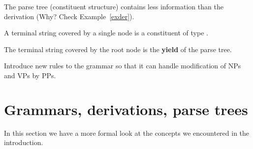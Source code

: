 \documentclass[11pt]{article}
\begin{document}
{\begin{center}
\end{center}

\item The parse tree (constituent structure) contains less information than
the derivation (Why? Check Example~\ref{exder}).
\item A terminal string \sysm{\sigma} covered by a single node  is a
constituent of type .
\item The terminal string covered by the root node is the
\textbf{yield} of the parse tree.

\begin{uexercise}
Introduce new rules to the grammar so that it can handle modification of NPs and
VPs by PPs.
\end{uexercise}
}

\newpage

\section{Grammars, derivations, parse trees}

In this section we have a more formal look at the concepts we encountered in the
introduction.
	
\end{document}
